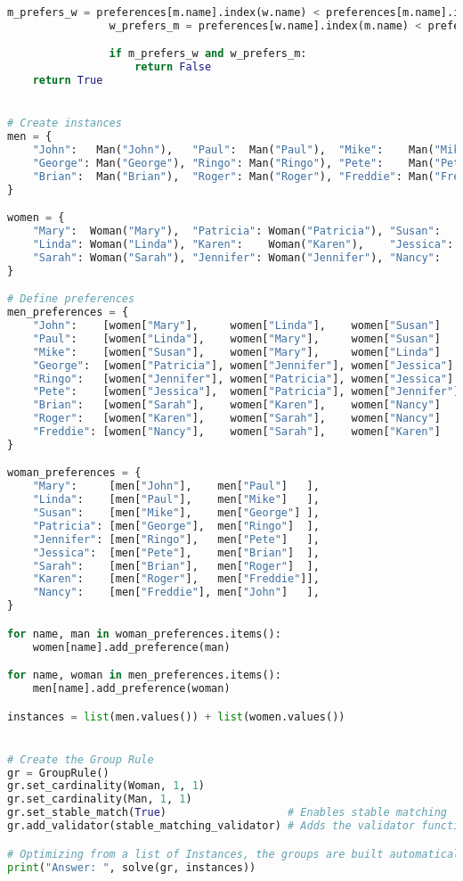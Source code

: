 \begin{lstlisting}[language=Python, caption={Creating and solving the Stable Marriage Problem using this framework.}, label={script:stable_marriage}]
                m_prefers_w = preferences[m.name].index(w.name) < preferences[m.name].index(current_w.name)
                w_prefers_m = preferences[w.name].index(m.name) < preferences[w.name].index(current_m.name)

                if m_prefers_w and w_prefers_m:
                    return False
    return True


# Create instances
men = {
    "John":   Man("John"),   "Paul":  Man("Paul"),  "Mike":    Man("Mike"),
    "George": Man("George"), "Ringo": Man("Ringo"), "Pete":    Man("Pete"),
    "Brian":  Man("Brian"),  "Roger": Man("Roger"), "Freddie": Man("Freddie")
}

women = {
    "Mary":  Woman("Mary"),  "Patricia": Woman("Patricia"), "Susan":   Woman("Susan"),
    "Linda": Woman("Linda"), "Karen":    Woman("Karen"),    "Jessica": Woman("Jessica"),
    "Sarah": Woman("Sarah"), "Jennifer": Woman("Jennifer"), "Nancy":   Woman("Nancy")
}

# Define preferences
men_preferences = {
    "John":    [women["Mary"],     women["Linda"],    women["Susan"]   ],
    "Paul":    [women["Linda"],    women["Mary"],     women["Susan"]   ],
    "Mike":    [women["Susan"],    women["Mary"],     women["Linda"]   ],
    "George":  [women["Patricia"], women["Jennifer"], women["Jessica"] ],
    "Ringo":   [women["Jennifer"], women["Patricia"], women["Jessica"] ],
    "Pete":    [women["Jessica"],  women["Patricia"], women["Jennifer"]],
    "Brian":   [women["Sarah"],    women["Karen"],    women["Nancy"]   ],
    "Roger":   [women["Karen"],    women["Sarah"],    women["Nancy"]   ],
    "Freddie": [women["Nancy"],    women["Sarah"],    women["Karen"]   ],
}

woman_preferences = {
    "Mary":     [men["John"],    men["Paul"]   ],
    "Linda":    [men["Paul"],    men["Mike"]   ],
    "Susan":    [men["Mike"],    men["George"] ],
    "Patricia": [men["George"],  men["Ringo"]  ],
    "Jennifer": [men["Ringo"],   men["Pete"]   ],
    "Jessica":  [men["Pete"],    men["Brian"]  ],
    "Sarah":    [men["Brian"],   men["Roger"]  ],
    "Karen":    [men["Roger"],   men["Freddie"]],
    "Nancy":    [men["Freddie"], men["John"]   ],
}

for name, man in woman_preferences.items():
    women[name].add_preference(man)

for name, woman in men_preferences.items():
    men[name].add_preference(woman)

instances = list(men.values()) + list(women.values())


# Create the Group Rule
gr = GroupRule()
gr.set_cardinality(Woman, 1, 1)
gr.set_cardinality(Man, 1, 1)
gr.set_stable_match(True)                   # Enables stable matching
gr.add_validator(stable_matching_validator) # Adds the validator function

# Optimizing from a list of Instances, the groups are built automatically.
print("Answer: ", solve(gr, instances))
\end{lstlisting}


